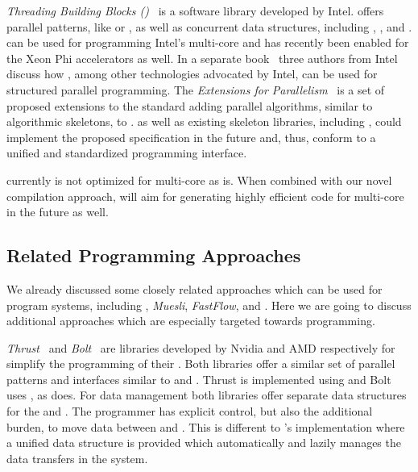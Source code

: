 \bigskip

\emph{Threading Building Blocks (\TBB)}~\cite{Reinders2007} is a software library developed by Intel.
\TBB offers parallel patterns, like  or , as well as concurrent data structures, including , , and .
\TBB can be used for programming Intel's multi-core \CPUs and has recently been enabled for the Xeon Phi accelerators as well.
In a separate book~\cite{McCoolRoRe2012} three authors from Intel discuss how \TBB, among other technologies advocated by Intel, can be used for structured parallel programming.
The \emph{\Cpp Extensions for Parallelism}~\cite{CppParallelism} is a set of proposed extensions to the \Cpp standard adding parallel algorithms, similar to algorithmic skeletons, to \Cpp.
\TBB as well as existing skeleton libraries, including \SkelCL, could implement the proposed specification in the future and, thus, conform to a unified and standardized programming interface.

\SkelCL currently is not optimized for multi-core \CPUs as \TBB is.
When combined with our novel compilation approach, \SkelCL will aim for generating highly efficient code for multi-core \CPUs in the future as well.

\subsection{Related \GPU Programming Approaches}
We already discussed some closely related approaches which can be used for program \GPU systems, including \emph{\SkePU}, \emph{Muesli}, \emph{FastFlow}, and \emph{\JPAI}.
Here we are going to discuss additional approaches which are especially targeted towards \GPU programming.

\bigskip

\emph{Thrust}~\cite{BellHo2011} and \emph{Bolt}~\cite{Thrust} are \Cpp libraries developed by Nvidia and AMD respectively for simplify the programming of their \GPUs.
Both libraries offer a similar set of parallel patterns and interfaces similar to \TBB and \SkelCL.
Thrust is implemented using \CUDA and Bolt uses \OpenCL, as \SkelCL does.
For data management both libraries offer separate data structures for the \CPU and \GPU.
The programmer has explicit control, but also the additional burden, to move data between \CPU and \GPU.
This is different to \SkelCL's implementation where a unified data structure is provided which automatically and lazily manages the data transfers in the system.

